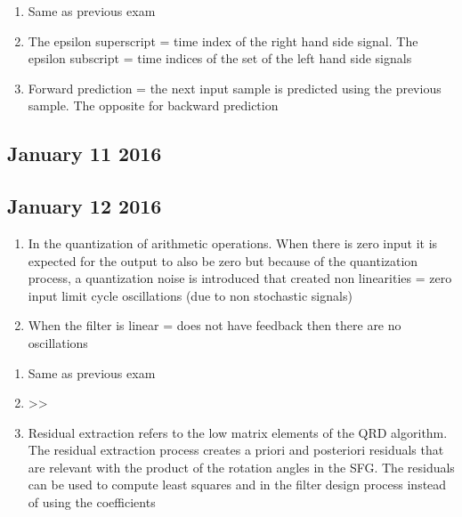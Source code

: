 \documentclass[
  a4paper,
  ,captions=tableheading
]{scrartcl}
\providecommand{\tightlist}{%
  \setlength{\itemsep}{0pt}\setlength{\parskip}{0pt}}
\begin{document}
\begin{enumerate}
\def\labelenumi{\arabic{enumi}.}
\tightlist
\item
  Same as previous exam\\
\item
  The epsilon superscript = time index of the right hand side signal.
  The epsilon subscript = time indices of the set of the left hand side
  signals\\
\item
  Forward prediction = the next input sample is predicted using the
  previous sample. The opposite for backward prediction
\end{enumerate}

\subsection{January 11 2016}\label{january-11-2016}

\subsection{January 12 2016}\label{january-12-2016}

\begin{enumerate}
\def\labelenumi{\arabic{enumi}.}
\tightlist
\item
  In the quantization of arithmetic operations. When there is zero input
  it is expected for the output to also be zero but because of the
  quantization process, a quantization noise is introduced that created
  non linearities = zero input limit cycle oscillations (due to non
  stochastic signals)\\
\item
  When the filter is linear = does not have feedback then there are no
  oscillations
\end{enumerate}

\begin{enumerate}
\def\labelenumi{\arabic{enumi}.}
\tightlist
\item
  Same as previous exam\\
\item
  \textgreater\textgreater{}\\
\item
  Residual extraction refers to the low matrix elements of the QRD
  algorithm. The residual extraction process creates a priori and
  posteriori residuals that are relevant with the product of the
  rotation angles in the SFG. The residuals can be used to compute least
  squares and in the filter design process instead of using the
  coefficients
\end{enumerate}
\end{document}
